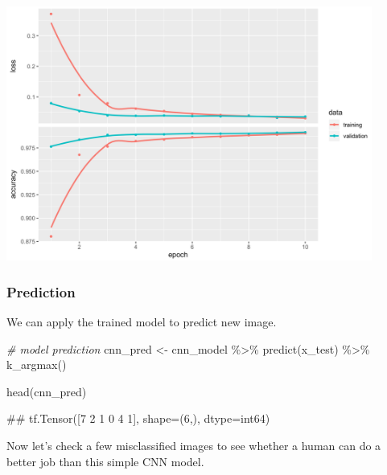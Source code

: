 \documentclass[
  12pt,
]{krantz}
\makeatletter
\newenvironment{Shaded}{\begin{snugshade}}{\end{snugshade}}
\newcommand{\CommentTok}[1]{\textcolor[rgb]{0.37,0.37,0.37}{\textit{#1}}}
\newcommand{\DocumentationTok}[1]{\textcolor[rgb]{0.37,0.37,0.37}{\textbf{\textit{#1}}}}
\newcommand{\FunctionTok}[1]{\textcolor[rgb]{0,0,0}{#1}}
\newcommand{\NormalTok}[1]{#1}
\newcommand{\OtherTok}[1]{\textcolor[rgb]{0.37,0.37,0.37}{#1}}
\newcommand{\SpecialCharTok}[1]{\textcolor[rgb]{0,0,0}{#1}}
\newenvironment{kframe}{%
\medskip{}
\setlength{\fboxsep}{.8em}
 \def\at@end@of@kframe{}%
 \ifinner\ifhmode%
  \def\at@end@of@kframe{\end{minipage}}%
  \begin{minipage}{\columnwidth}%
 \fi\fi%
 \def\FrameCommand##1{\hskip\@totalleftmargin \hskip-\fboxsep
 \colorbox{shadecolor}{##1}\hskip-\fboxsep
     \hskip-\linewidth \hskip-\@totalleftmargin \hskip\columnwidth}%
 \MakeFramed {\advance\hsize-\width
   \@totalleftmargin\z@ \linewidth\hsize
   \@setminipage}}%
 {\par\unskip\endMakeFramed%
 \at@end@of@kframe}
\renewenvironment{Shaded}{\begin{kframe}}{\end{kframe}}
\makeatother
\begin{document}
\includegraphics[width=0.9\textwidth,height=\textheight]{images/cnn_history.png}

\hypertarget{prediction-1}{%
\subsubsection{Prediction}\label{prediction-1}}

We can apply the trained model to predict new image.

\begin{Shaded}
\begin{Highlighting}[]
\CommentTok{\# model prediction}
\NormalTok{cnn\_pred }\OtherTok{\textless{}{-}}\NormalTok{ cnn\_model }\SpecialCharTok{\%\textgreater{}\%}
  \FunctionTok{predict}\NormalTok{(x\_test) }\SpecialCharTok{\%\textgreater{}\%}
  \FunctionTok{k\_argmax}\NormalTok{()}

\FunctionTok{head}\NormalTok{(cnn\_pred)}
\end{Highlighting}
\end{Shaded}

\begin{Shaded}
\begin{Highlighting}[]
\NormalTok{\#\# tf.Tensor([7 2 1 0 4 1], shape=(6,), dtype=int64)}
\end{Highlighting}
\end{Shaded}

Now let's check a few misclassified images to see whether a human can do a better job than this simple CNN model.

\begin{Shaded}
\end{Shaded}
\end{document}
